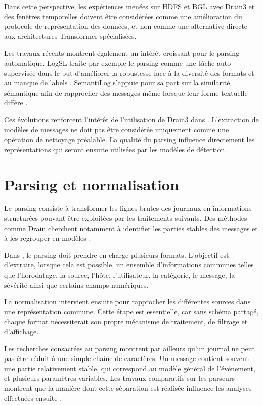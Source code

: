 Dans cette perspective, les expériences menées sur HDFS et BGL avec Drain3 et des fenêtres temporelles doivent être considérées comme une amélioration du protocole de représentation des données, et non comme une alternative directe aux architectures Transformer spécialisées.

Les travaux récents montrent également un intérêt croissant pour le parsing automatique. LogSL traite par exemple le parsing comme une tâche auto-supervisée dans le but d'améliorer la robustesse face à la diversité des formats et au manque de labels \cite{cao2024logsl}. SemantiLog s'appuie pour sa part sur la similarité sémantique afin de rapprocher des messages même lorsque leur forme textuelle diffère \cite{shavit2024semantilog}.

Ces évolutions renforcent l'intérêt de l'utilisation de Drain3 dans \logminer{}. L'extraction de modèles de messages ne doit pas être considérée uniquement comme une opération de nettoyage préalable. La qualité du parsing influence directement les représentations qui seront ensuite utilisées par les modèles de détection.

\section{Parsing et normalisation}

Le parsing consiste à transformer les lignes brutes des journaux en informations structurées pouvant être exploitées par les traitements suivants. Des méthodes comme Drain cherchent notamment à identifier les parties stables des messages et à les regrouper en modèles \cite{he2016drain}.

Dans \logminer{}, le parsing doit prendre en charge plusieurs formats. L'objectif est d'extraire, lorsque cela est possible, un ensemble d'informations communes telles que l'horodatage, la source, l'hôte, l'utilisateur, la catégorie, le message, la sévérité ainsi que certains champs numériques.

La normalisation intervient ensuite pour rapprocher les différentes sources dans une représentation commune. Cette étape est essentielle, car sans schéma partagé, chaque format nécessiterait son propre mécanisme de traitement, de filtrage et d'affichage.

Les recherches consacrées au parsing montrent par ailleurs qu'un journal ne peut pas être réduit à une simple chaîne de caractères. Un message contient souvent une partie relativement stable, qui correspond au modèle général de l'événement, et plusieurs paramètres variables. Les travaux comparatifs sur les parseurs montrent que la manière dont cette séparation est réalisée influence les analyses effectuées ensuite \cite{zhu2019logparser}.

